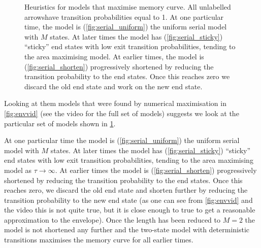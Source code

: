 \documentclass[12pt]{article}
\begin{document}
\begin{figure}[tb]
  \centering
  \begin{myenuma}
    \item{}\hspace{0.02\linewidth}\label{fig:serial_uniform}
    \item{}\hspace{0.02\linewidth}\label{fig:serial_sticky}
    \item{}\label{fig:serial_shorten}
  \end{myenuma}
  \caption[Heuristic optimal models]{Heuristics for models that maximise memory curve.
  All unlabelled arrowshave transition probabilities equal to 1.
  At one particular time, the model is (\ref{fig:serial_uniform}) the uniform serial model with \(M\) states.
  At later times the model has (\ref{fig:serial_sticky}) ``sticky'' end states with low exit transition probabilities, tending to the area maximising model.
  At earlier times, the model is (\ref{fig:serial_shorten}) progressively shortened by reducing the transition probability to the end states.
  Once this reaches zero we discard the old end state and work on the new end state.
  } \label{fig:heuristicmodels}
\end{figure}


Looking at them models that were found by numerical maximisation in \cref{fig:envvid} (see the video for the full set of models) suggests we look at the particular set of models shown in \cref{fig:heuristicmodels}.

At one particular time the model is (\ref{fig:serial_uniform}) the uniform serial model with \(M\) states.
At later times the model has (\ref{fig:serial_sticky}) ``sticky'' end states with low exit transition probabilities, tending to the area maximising model as \(\tau \to \infty\).
At earlier times the model is (\ref{fig:serial_shorten}) progressively shortened by reducing the transition probability to the end states.
Once this reaches zero, we discard the old end state and shorten further by reducing the transition probability to the new end state (as one can see from \cref{fig:envvid} and the video this is not quite true, but it is close enough to true to get a reasonable approximation to the envelope).
Once the length has been reduced to \(M=2\) the model is not shortened any further and the two-state model with deterministic transitions maximises the memory curve for all earlier times.
\end{document}
